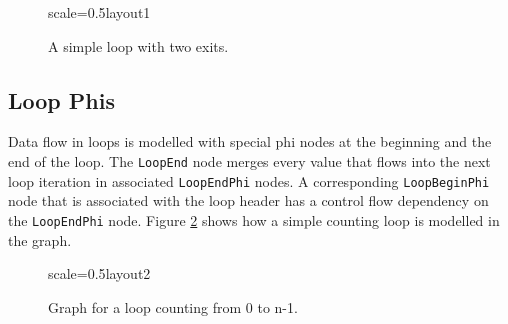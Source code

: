 \documentclass[twocolumn]{svjour3}
\newcommand\nodename[1]{\texttt{#1}}
\begin{document}
\begin{figure}[h]
  \centering
\begin{digraphenv}{scale=0.5}{layout1}
\end{digraphenv}
  \caption{A simple loop with two exits.}
  \label{fig:loop1}
\end{figure}

\subsection{Loop Phis}
Data flow in loops is modelled with special phi nodes at the beginning and the end of the loop.
The \nodename{LoopEnd} node merges every value that flows into the next loop iteration in associated \nodename{LoopEndPhi} nodes.
A corresponding \nodename{LoopBeginPhi} node that is associated with the loop header has a control flow dependency on the \nodename{LoopEndPhi} node.
Figure \ref{fig:loop2} shows how a simple counting loop is modelled in the graph.

\begin{figure}[h]
  \centering
\begin{digraphenv}{scale=0.5}{layout2}
\end{digraphenv}
  \caption{Graph for a loop counting from 0 to n-1.}
  \label{fig:loop2}
\end{figure}
\end{document}
